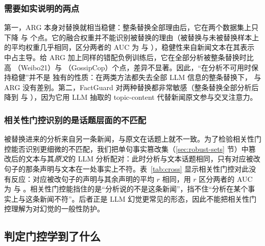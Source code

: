 \subsubsection{需要如实说明的两点}
第一，ARG 本身对替换就相当稳健：整条替换全部理由后，它在两个数据集上只下降  与  个点。它的融合权重并不能识别被替换的理由（被替换与未被替换样本上的平均权重几乎相同，区分两者的 AUC 为  与 ），稳健性来自新闻文本在其表示中占主导。给 ARG 加上同样的错配负例训练后，它在全部分析被整条替换时比 \method{} 高 （Weibo21）与 （GossipCop）个点，差异不显著。因此，“在分析不可用时保持稳健”并不是 \method{} 独有的性质：在两类方法都失去全部 LLM 信息的整条替换下，\method{} 与 ARG 没有差别。第二，FactGuard 对两种替换都非常敏感（整条替换全部分析后降到  与 ），因为它用 LLM 抽取的 topic-content 代替新闻原文参与交叉注意力。

\subsubsection{相关性门控识别的是话题层面的不匹配}
被替换进来的分析来自另一条新闻，与原文在话题上就不一致。为了检验相关性门控能否识别更细微的不匹配，我们把单句事实篡改集（\ref{sec:robust-sets} 节）中篡改后的文本与其\emph{原文}的 LLM 分析配对：此时分析与文本话题相同，只有对应被改句子的那条声明与文本在一处事实上不符。表~\ref{tab:cross} 显示相关性门控对此没有反应：对应被改句子的声明与其余声明的平均 $r$ 相同，用 $r$ 区分两者的 AUC 为  与 。相关性门控能挡住的是“分析说的不是这条新闻”，挡不住“分析在某个事实上与这条新闻不符”。后者正是 LLM 幻觉更常见的形态，因此不能把相关性门控理解为对幻觉的一般性防护。

\begin{table}[htbp]
\centering\small
\caption{篡改后的文本搭配不同分析时的平均相关性门控 $r$}\label{tab:cross}
\end{table}

\subsection{判定门控学到了什么}\label{sec:exp-gate}

